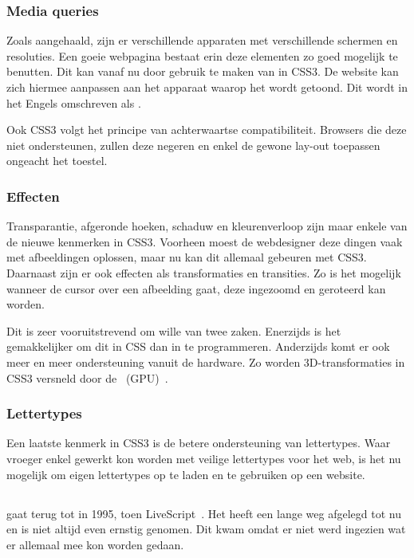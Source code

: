 \subsubsection{Media queries}
Zoals aangehaald, zijn er verschillende apparaten met verschillende schermen en resoluties. 
Een goeie webpagina bestaat erin deze elementen zo goed mogelijk te benutten. 
Dit kan vanaf nu door gebruik te maken van  in CSS3. 
De website kan zich hiermee aanpassen aan het apparaat waarop het wordt getoond. 
Dit wordt in het Engels omschreven als .

Ook CSS3 volgt het principe van achterwaartse compatibiliteit. 
Browsers die deze  niet ondersteunen, zullen deze negeren en enkel de gewone lay-out toepassen ongeacht het toestel.

\subsubsection{Effecten}
Transparantie, afgeronde hoeken, schaduw en kleurenverloop zijn maar enkele van de nieuwe kenmerken in CSS3. 
Voorheen moest de webdesigner deze dingen vaak met afbeeldingen oplossen, maar nu kan dit allemaal gebeuren met CSS3. 
Daarnaast zijn er ook effecten als transformaties en transities. 
Zo is het mogelijk wanneer de cursor over een afbeelding gaat, deze ingezoomd en geroteerd kan worden. 

Dit is zeer vooruitstrevend om wille van twee zaken. 
Enerzijds is het gemakkelijker om dit in CSS dan in \js{} te programmeren. 
Anderzijds komt er ook meer en meer ondersteuning vanuit de hardware. 
Zo worden 3D-transformaties in CSS3 versneld door de ~(GPU)~\cite{Hales2012,Kool2012}.

\subsubsection{Lettertypes}
Een laatste kenmerk in CSS3 is de betere ondersteuning van lettertypes. 
Waar vroeger enkel gewerkt kon worden met veilige lettertypes voor het web, is het nu mogelijk om eigen lettertypes op te laden en te gebruiken op een website.

\subsection{\js}
\label{ref:javascript}
\js{} gaat terug tot in 1995, toen LiveScript~\cite{McFarland2011}. 
Het heeft een lange weg afgelegd tot nu en is niet altijd even ernstig genomen. 
Dit kwam omdat er niet werd ingezien wat er allemaal mee kon worden gedaan. 


